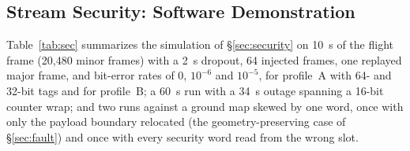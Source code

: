 \documentclass[12pt,letterpaper]{article}
\begin{document}
\subsection{Stream Security: Software Demonstration}\label{sec:res-sec}

Table~\ref{tab:sec} summarizes the simulation of \S\ref{sec:security} on 10~s of the flight
frame (20{,}480 minor frames) with a 2~s dropout, 64 injected frames, one replayed major
frame, and bit-error rates of 0, $10^{-6}$ and $10^{-5}$, for profile~A with 64- and
32-bit tags and for profile~B; a 60~s run with a 34~s outage spanning a 16-bit counter wrap;
and two runs against a ground map skewed by one word, once with only the payload boundary
relocated (the geometry-preserving case of \S\ref{sec:fault}) and once with every security
word read from the wrong slot.


\end{document}
